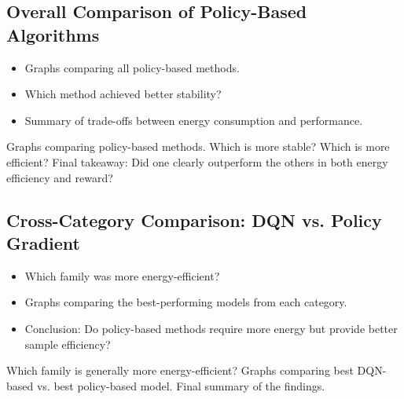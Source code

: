 \subsection{Overall Comparison of Policy-Based Algorithms}
\begin{itemize}
	\item Graphs comparing all policy-based methods.
	\item Which method achieved better stability?
	\item Summary of trade-offs between energy consumption and performance.
\end{itemize}
Graphs comparing policy-based methods.
Which is more stable? Which is more efficient?
Final takeaway: Did one clearly outperform the others in both energy efficiency and reward?


\subsection{Cross-Category Comparison: DQN vs. Policy Gradient}
\begin{itemize}
	\item Which family was more energy-efficient?
	\item Graphs comparing the best-performing models from each category.
	\item Conclusion: Do policy-based methods require more energy but provide better sample efficiency?
\end{itemize}
Which family is generally more energy-efficient?
Graphs comparing best DQN-based vs. best policy-based model.
Final summary of the findings.